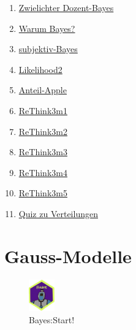 \documentclass[
  a4paper,
  DIV=11]{scrreprt}
\providecommand{\tightlist}{%
  \setlength{\itemsep}{0pt}\setlength{\parskip}{0pt}}\usepackage{longtable,booktabs,array}
\theoremstyle{definition}
\theoremstyle{remark}
\begin{document}
\begin{enumerate}
\def\labelenumi{\arabic{enumi}.}
\tightlist
\item
  \href{https://datenwerk.netlify.app/posts/zwielichter-dozent-bayes/zwielichter-dozent-bayes}{Zwielichter
  Dozent-Bayes}
\item
  \href{https://datenwerk.netlify.app/posts/warum-bayes/warum-bayes}{Warum
  Bayes?}
\item
  \href{https://datenwerk.netlify.app/posts/subjektiv-bayes/subjektiv-bayes}{subjektiv-Bayes}
\item
  \href{https://datenwerk.netlify.app/posts/likelihood2/likelihood2}{Likelihood2}
\item
  \href{https://datenwerk.netlify.app/posts/anteil-apple/anteil-apple}{Anteil-Apple}
\item
  \href{https://datenwerk.netlify.app/posts/rethink3m1/rethink3m1}{ReThink3m1}
\item
  \href{https://datenwerk.netlify.app/posts/rethink3m2/rethink3m2}{ReThink3m2}
\item
  \href{https://datenwerk.netlify.app/posts/rethink3m3/rethink3m3}{ReThink3m3}
\item
  \href{https://datenwerk.netlify.app/posts/rethink3m4/rethink3m4}{ReThink3m4}
\item
  \href{https://datenwerk.netlify.app/posts/rethink3m5/rethink3m5}{ReThink3m5}
\item
  \href{https://datenwerk.netlify.app/\#category=Verteilungen-Quiz}{Quiz
  zu Verteilungen}
\end{enumerate}


\hypertarget{gauss-modelle}{%
\chapter{Gauss-Modelle}\label{gauss-modelle}}

\begin{figure}

{\centering \includegraphics[width=0.1\textwidth,height=\textheight]{./img/Golem_hex.png}

}

\caption{Bayes:Start!}

\end{figure}
\end{document}
